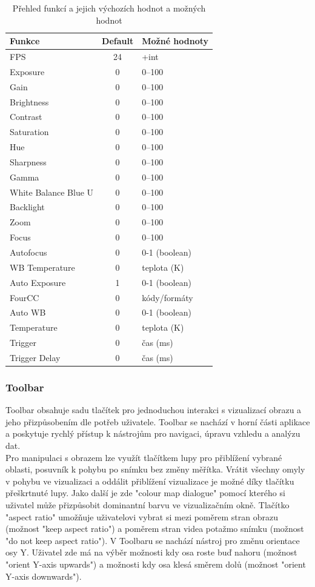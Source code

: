 \documentclass[a4paper,11pt]{article}
\begin{document}
\begin{table}[h!]
\centering
\begin{tabular}{|l|c|l|}
\hline
\textbf{Funkce} & \textbf{Default} & \textbf{Možné hodnoty} \\
\hline
FPS & 24 & +int\\
Exposure & 0 & 0--100\\
Gain & 0 & 0--100\\
Brightness & 0 & 0--100\\
Contrast & 0 & 0--100\\
Saturation & 0 & 0--100\\
Hue & 0 & 0--100\\
Sharpness & 0 & 0--100\\
Gamma & 0 & 0--100\\
White Balance Blue U & 0 & 0--100\\
Backlight & 0 & 0--100\\
Zoom & 0 & 0--100\\
Focus & 0 & 0--100\\
Autofocus & 0 & 0-1 (boolean)\\
WB Temperature & 0 & teplota (K)\\
Auto Exposure & 1 & 0-1 (boolean)\\
FourCC & 0 & kódy/formáty\\
Auto WB & 0 & 0-1 (boolean)\\
Temperature & 0 & teplota (K)\\
Trigger & 0 & čas (ms)\\
Trigger Delay & 0 & čas (ms)\\

\hline
\end{tabular}
\caption{Přehled funkcí a jejich výchozích hodnot a možných hodnot}
\end{table}

\vspace{1.5cm}


\subsubsection{Toolbar}
Toolbar obsahuje sadu tlačítek pro jednoduchou interakci s vizualizací obrazu a jeho přizpůsobením dle potřeb uživatele. Toolbar se nachází v horní části aplikace a poskytuje rychlý přístup k nástrojům pro navigaci, úpravu vzhledu a analýzu dat.\\

Pro manipulaci s obrazem lze využít tlačítkem lupy pro přiblížení vybrané oblasti, posuvník k pohybu po snímku bez změny měřítka. Vrátit všechny omyly v pohybu ve vizualizaci a oddálit přiblížení vizualizace je možné díky tlačítku přeškrtnuté lupy. Jako další je zde "colour map dialogue" pomocí kterého si uživatel může přizpůsobit dominantní barvu ve vizualizačním okně. Tlačítko "aspect ratio" umožňuje uživatelovi vybrat si mezi poměrem stran obrazu (možnost "keep aspect  ratio") a poměrem stran videa potažmo snímku (možnost "do not keep aspect ratio"). V Toolbaru se nachází nástroj pro změnu orientace osy Y. Uživatel zde má na výběr možnosti kdy osa roste buď nahoru (možnost "orient Y-axis upwards") a možnosti kdy osa klesá směrem dolů (možnost "orient Y-axis downwards").\\
\end{document}
